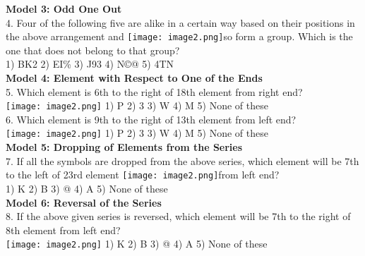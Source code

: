 \documentclass[
]{article}
\begin{document}
\textbf{Model 3: Odd One Out}\\
4. Four of the following five are alike in a certain way based on their positions in the above arrangement and \texttt{[image: image2.png]}so form a group. Which is the one that does not belong to that group?\\
1) BK2 \hspace{2mm}2) EI\% \hspace{2mm}3) J93 \hspace{2mm}4) N©@ \hspace{2mm}5) 4TN\\

\textbf{Model 4: Element with Respect to One of the Ends}\\
5. Which element is 6th to the right of 18th element from right end?\\
\texttt{[image: image2.png]}
1) P \hspace{2mm}2) 3 \hspace{2mm}3) W \hspace{2mm}4) M \hspace{2mm}5) None of these\\

6. Which element is 9th to the right of 13th element from left end?\\
\texttt{[image: image2.png]}
1) P \hspace{2mm}2) 3 \hspace{2mm}3) W \hspace{2mm}4) M \hspace{2mm}5) None of these\\

\textbf{Model 5: Dropping of Elements from the Series}\\
7. If all the symbols are dropped from the above series, which element will be 7th to the left of 23rd element \texttt{[image: image2.png]}from left end?\\
1) K \hspace{2mm}2) B \hspace{2mm}3) @ \hspace{2mm}4) A \hspace{2mm}5) None of these\\

\textbf{Model 6: Reversal of the Series}\\
8. If the above given series is reversed, which element will be 7th to the right of 8th element from left end?\\
\texttt{[image: image2.png]}
1) K \hspace{2mm}2) B \hspace{2mm}3) @ \hspace{2mm}4) A \hspace{2mm}5) None of these\\
\end{document}

